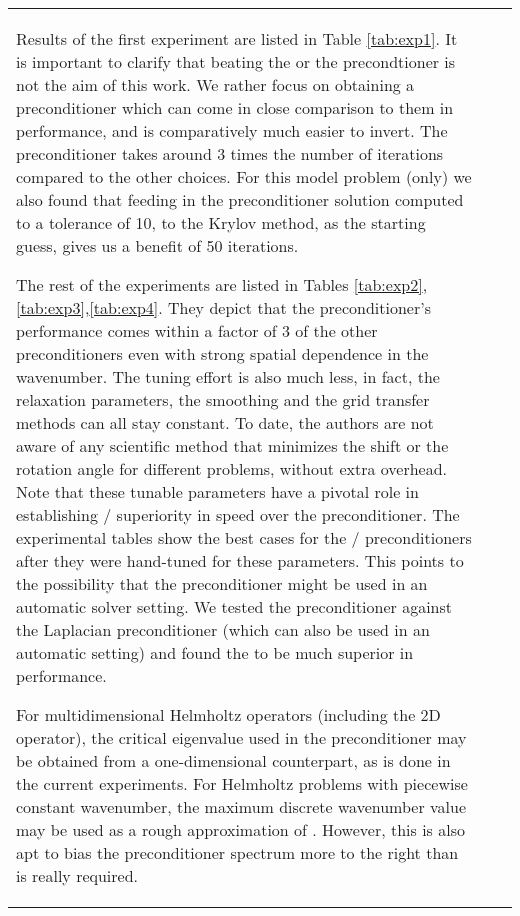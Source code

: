 \documentclass[mathpazo]{cicp}
\theoremstyle{definition}
\numberwithin{equation}{section}
\providecommand{\hbz}{}
\providecommand{\edt}{}
\begin{document}
\begin{algorithm}
\begin{enumerate}
\begin{tabular}{lll}
Results of the first experiment are listed in Table \ref{tab:exp1}. It is important to clarify that beating the  or the  precondtioner is not the aim of this work. We rather focus on obtaining a preconditioner which can come in close comparison to them in performance, and is comparatively much easier to invert. The  preconditioner takes around 3 times the number of iterations compared to the other choices. For this model problem (only) we also found that feeding in the preconditioner solution computed to a tolerance of \edt{10}, to the Krylov method, as the starting guess, gives us a benefit of 50 iterations.

The rest of the experiments are listed in Tables \ref{tab:exp2},\ref{tab:exp3},\ref{tab:exp4}. They depict that the  preconditioner's performance comes within a factor of 3 of the other preconditioners even with strong spatial dependence in the wavenumber. The tuning effort is also much less, in fact, the relaxation parameters, the smoothing and the grid transfer methods can all stay constant. \hbz{To date, the authors are not aware of any scientific method that minimizes the  shift or the  rotation angle for different problems, without extra overhead. Note that these tunable parameters have a pivotal role in establishing / superiority in speed over the  preconditioner. The experimental tables show the best cases for the / preconditioners after they were hand-tuned for these parameters.} This points to the possibility that the  preconditioner might be used in an automatic solver setting. We tested the  preconditioner against the Laplacian preconditioner \hbz{(which can also be used in an automatic setting)} and found the  to be much superior in performance.

For multidimensional Helmholtz operators (including the 2D operator), the critical eigenvalue  used in the  preconditioner may be obtained from a one-dimensional counterpart, as is done in the current experiments. For Helmholtz problems with piecewise constant wavenumber, the maximum discrete wavenumber value may be used as a rough approximation of . However, this is also apt to bias the  preconditioner spectrum more to the right than is really required.


\end{tabular}
\end{enumerate}
\end{algorithm}
\end{document}
